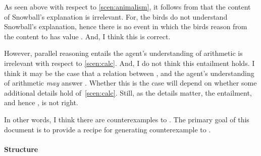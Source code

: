 \begin{note}
  As seen above with respect to \autoref{scen:animalism}, it follows from \issueInclusion{} that the content of Snowball's explanation is irrelevant.
  For, the birds do not understand Snowball's explanation, hence there is no event in which the birds reason from the content to  has value .
  And, I think this is correct.

  However, parallel reasoning entails the agent's understanding of arithmetic is irrelevant with respect to \autoref{scen:calc}.
  And, I do not think this entailment holds.
  I think it may be the case that a relation between \propM{\gistCalcEq{}},  and the agent's understanding of arithmetic \emph{may} answer \qWhy{}.
  Whether this is the case will depend on whether some additional details hold of~\autoref{scen:calc}.
  Still, as the details matter, the entailment, and hence \issueInclusion{}, is not right.
\end{note}

\begin{note}
  In other words, I think there are counterexamples to \issueInclusion{}.
  The primary goal of this document is to provide a recipe for generating counterexample to \issueInclusion{}.
\end{note}

\paragraph*{Structure}

